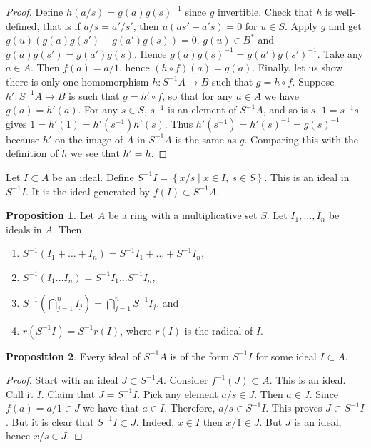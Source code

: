 \documentclass{article}
\newcommand{\rb}[1]{\left( #1 \right)}
\newcommand{\cb}[1]{\left\{ #1 \right\}}
\theoremstyle{definition}\newtheorem{definition}{Definition}[section]
\theoremstyle{definition}\newtheorem{remark}[definition]{Remark}
\theoremstyle{definition}\newtheorem*{example}{Example}
\theoremstyle{definition}\newtheorem*{note}{Note}
\newtheorem{proposition}[definition]{Proposition}
\begin{document}
\begin{proof}
Define $ h\rb{a / s} = g\rb{a}g\rb{s}^{-1} $ since $ g $ invertible. Check that $ h $ is well-defined, that is if $ a / s = a' / s' $, then $ u\rb{as' - a's} = 0 $ for $ u \in S $. Apply $ g $ and get $ g\rb{u}\rb{g\rb{a}g\rb{s'} - g\rb{a'}g\rb{s}} = 0 $. $ g\rb{u} \in B^* $ and $ g\rb{a}g\rb{s'} = g\rb{a'}g\rb{s} $. Hence $ g\rb{a}g\rb{s}^{-1} = g\rb{a'}g\rb{s'}^{-1} $. Take any $ a \in A $. Then $ f\rb{a} = a / 1 $, hence $ \rb{h \circ f}\rb{a} = g\rb{a} $. Finally, let us show there is only one homomorphism $ h : S^{-1}A \to B $ such that $ g = h \circ f $. Suppose $ h' : S^{-1}A \to B $ is such that $ g = h' \circ f $, so that for any $ a \in A $ we have $ g\rb{a} = h'\rb{a} $. For any $ s \in S $, $ s^{-1} $ is an element of $ S^{-1}A $, and so is $ s $. $ 1 = s^{-1}s $ gives $ 1 = h'\rb{1} = h'\rb{s^{-1}}h'\rb{s} $. Thus $ h'\rb{s^{-1}} = h'\rb{s}^{-1} = g\rb{s}^{-1} $ because $ h' $ on the image of $ A $ in $ S^{-1}A $ is the same as $ g $. Comparing this with the definition of $ h $ we see that $ h' = h $.
\end{proof}

Let $ I \subset A $ be an ideal. Define $ S^{-1}I = \cb{x / s \mid x \in I, \ s \in S} $. This is an ideal in $ S^{-1}I $. It is the ideal generated by $ f\rb{I} \subset S^{-1}A $.

\begin{proposition}
Let $ A $ be a ring with a multiplicative set $ S $. Let $ I_1, \dots, I_n $ be ideals in $ A $. Then
\begin{enumerate}
\item $ S^{-1}\rb{I_1 + \dots + I_n} = S^{-1}I_1 + \dots + S^{-1}I_n $,
\item $ S^{-1}\rb{I_1 \dots I_n} = S^{-1}I_1 \dots S^{-1}I_n $,
\item $ S^{-1}\rb{\bigcap_{j = 1}^n I_j} = \bigcap_{j = 1}^n S^{-1}I_j $, and
\item $ r\rb{S^{-1}I} = S^{-1}r\rb{I} $, where $ r\rb{I} $ is the radical of $ I $.
\end{enumerate}
\end{proposition}

\begin{proposition}
\label{prop:6.8}
Every ideal of $ S^{-1}A $ is of the form $ S^{-1}I $ for some ideal $ I \subset A $.
\end{proposition}

\begin{proof}
Start with an ideal $ J \subset S^{-1}A $. Consider $ f^{-1}\rb{J} \subset A $. This is an ideal. Call it $ I $. Claim that $ J = S^{-1}I $. Pick any element $ a / s \in J $. Then $ a \in J $. Since $ f\rb{a} = a / 1 \in J $ we have that $ a \in I $. Therefore, $ a / s \in S^{-1}I $. This proves $ J \subset S^{-1}I $. But it is clear that $ S^{-1}I \subset J $. Indeed, $ x \in I $ then $ x / 1 \in J $. But $ J $ is an ideal, hence $ x / s \in J $.
\end{proof}
\end{document}
